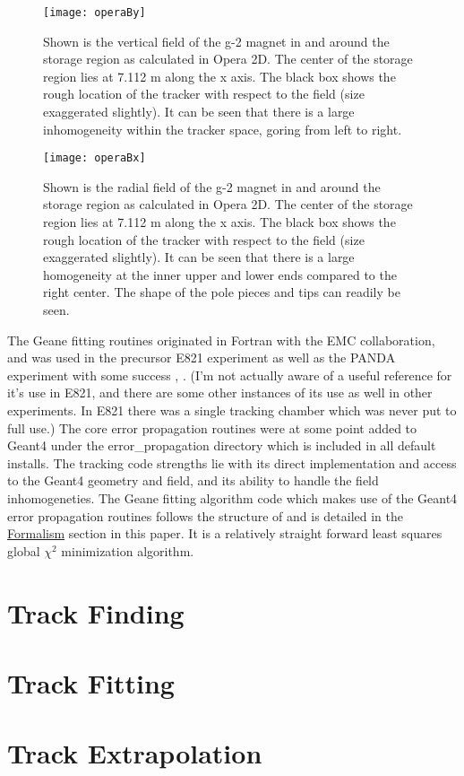 \begin{figure}[]
\caption{Shown is the vertical field of the g-2 magnet in and around the storage region as calculated in Opera 2D. The center of the storage region lies at 7.112 m along the x axis. The black box shows the rough location of the tracker with respect to the field (size exaggerated slightly). It can be seen that there is a large inhomogeneity within the tracker space, goring from left to right.}
\centering
\texttt{[image: operaBy]}
\label{fig:operaBy}
\end{figure}

\begin{figure}[]
\caption{Shown is the radial field of the g-2 magnet in and around the storage region as calculated in Opera 2D. The center of the storage region lies at 7.112 m along the x axis. The black box shows the rough location of the tracker with respect to the field (size exaggerated slightly). It can be seen that there is a large homogeneity at the inner upper and lower ends compared to the right center. The shape of the pole pieces and tips can readily be seen.}
\centering
\texttt{[image: operaBx]}
\label{fig:operaBx}
\end{figure}

  The Geane fitting routines originated in Fortran with the EMC collaboration, and was used in the precursor E821 experiment as well as the PANDA experiment with some success \cite{geanemanual}, \cite{Lavezzi}. (I'm not actually aware of a useful reference for it's use in E821, and there are some other instances of its use as well in other experiments. In E821 there was a single tracking chamber which was never put to full use.) The core error propagation routines were at some point added to Geant4 under the error\_propagation directory which is included in all default installs. The tracking code strengths lie with its direct implementation and access to the Geant4 geometry and field, and its ability to handle the field inhomogeneties. The Geane fitting algorithm code which makes use of the Geant4 error propagation routines follows the structure of \cite{geanemanual} and is detailed in the \hyperref[sec:Formalism]{Formalism} section in this paper. It is a relatively straight forward least squares global $\chi^{2}$ minimization algorithm. 








\section{Track Finding}
\label{sec:Track Finding}

\section{Track Fitting}
\label{sec:Track Fitting}

\section{Track Extrapolation}
\label{sec:Track Extrapolation}

